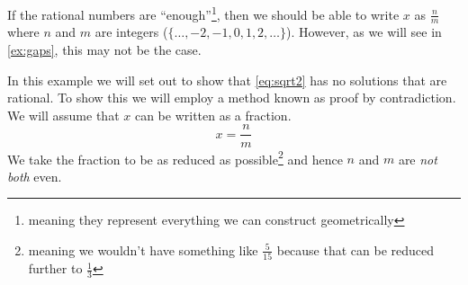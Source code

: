 \documentclass[../../templates/section]{subfiles}
\begin{document}
If the rational numbers are ``enough''\footnote{meaning they represent
everything we can construct geometrically}, then we should be able to write $x$
as $\frac{n}{m}$ where $n$ and $m$ are integers ({$\{\ldots, -2, -1,
0, 1, 2, \ldots\}$}).
However, as we will see in \cref{ex:gaps}, this may not be the case.

\begin{example}\label{ex:gaps}
In this example we will set out to show that \cref{eq:sqrt2} has no
solutions that are rational. To show this we will employ a method known as
proof by contradiction. We will assume that $x$ can be written as a fraction.
\begin{equation}\label{eq:sqrt2-is-rational}
    x = \frac{n}{m}
\end{equation}
We take the fraction to be as reduced as possible\footnote{meaning we
wouldn't have something like $\frac{5}{15}$ because that can be reduced further
to $\frac{1}{3}$} and hence $n$ and $m$ are \emph{not both} even.
\end{example}
\end{document}
